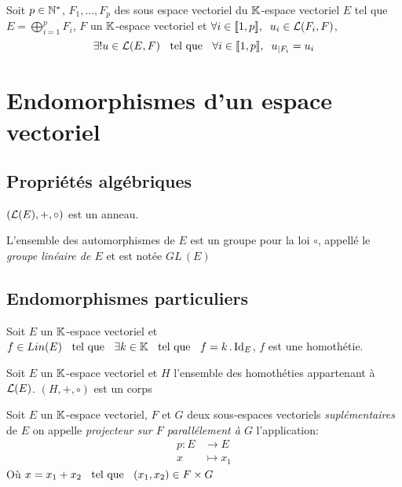 \begin{prp}
Soit $p \in \mathbb{N}^*$, $F_1, \ldots, F_p$ des sous espace vectoriel du
$\mathbb{K}$-espace vectoriel $E$ tel que $E = \bigoplus^p_{i = 1} F_i$, $F$
un $\mathbb{K}$-espace vectoriel et
$\forall i \in \llbracket 1, p \rrbracket, \;\; u_i \in \operatorname{\mathcal{L}}(F_i, F)$,
\[
    \exists! u \in \operatorname{\mathcal{L}}(E, F) \;\;\text{ tel que }\;\; \forall i \in \llbracket 1, p \rrbracket, \;\;
    u_{| F_i} = u_i
\]
\end{prp}


\section{Endomorphismes d'un espace vectoriel}


\subsection{Propriétés algébriques}

\begin{prp}
$(\operatorname{\mathcal{L}}(E), +, \circ)$ est un anneau.
\end{prp}

\begin{dfn}
L'ensemble des automorphismes de $E$ est un groupe pour la loi $\circ$,
appellé le \emph{groupe linéaire de $E$} et est notée $GL\,(E)$
\end{dfn}


\subsection{Endomorphismes particuliers}

\begin{dfn}[Homethétie]
Soit $E$ un $\mathbb{K}$-espace vectoriel et $f \in Lin(E) \;\;\text{ tel que }\;\; \exists k \in \mathbb{K}
\;\;\text{ tel que }\;\; f = k \operatorname{.} \operatorname{Id}_E$, $f$ est une homothétie.
\end{dfn}

\begin{prp}
Soit $E$ un $\mathbb{K}$-espace vectoriel et $H$ l'ensemble des homothéties
appartenant à $\operatorname{\mathcal{L}}(E)$.
$(H, +, \circ)$ est un corps
\end{prp}

\begin{dfn}[Projecteur]
Soit $E$ un $\mathbb{K}$-espace vectoriel, $F$ et $G$ deux sous-espaces vectoriels
\emph{suplémentaires} de $E$ on appelle \emph{projecteur sur $F$
parallélement à $G$} l'application:
\begin{align*}
    p:  E &\to E \\
        x &\mapsto x_1
\end{align*}
Où $x = x_1 + x_2 \;\;\text{ tel que }\;\; (x_1, x_2) \in F \times G$
\end{dfn}

